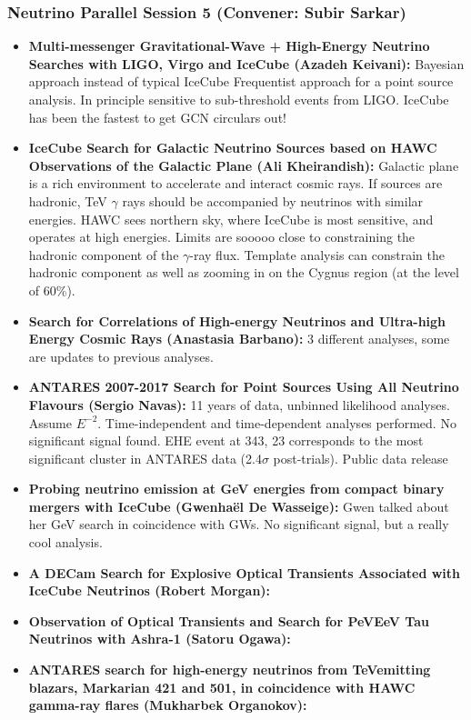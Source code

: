 \subsubsection{Neutrino Parallel Session 5 (Convener: Subir Sarkar)}
\begin{itemize}
    \item \textbf{ Multi-messenger Gravitational-Wave + High-Energy Neutrino Searches with LIGO, Virgo and IceCube (Azadeh Keivani):} Bayesian approach instead of typical IceCube Frequentist approach for a point source analysis. In principle sensitive to sub-threshold events from LIGO. IceCube has been the fastest to get GCN circulars out!
    \item \textbf{ IceCube Search for Galactic Neutrino Sources based on HAWC Observations of the Galactic Plane (Ali Kheirandish):} Galactic plane is a rich environment to accelerate and interact cosmic rays. If sources are hadronic, TeV $\gamma$ rays should be accompanied by neutrinos with similar energies. HAWC sees northern sky, where IceCube is most sensitive, and operates at high energies. Limits are sooooo close to constraining the hadronic component of the $\gamma$-ray flux. Template analysis can constrain the hadronic component as well as zooming in on the Cygnus region (at the level of 60\%).
    \item \textbf{Search for Correlations of High-energy Neutrinos and Ultra-high Energy Cosmic Rays (Anastasia Barbano):} 3 different analyses, some are updates to previous analyses.
    \item \textbf{ ANTARES 2007-2017 Search for Point Sources Using All Neutrino Flavours (Sergio Navas):} 11 years of data, unbinned likelihood analyses. Assume $E^{-2}$. Time-independent and time-dependent analyses performed. No significant signal found. EHE event at 343, 23 corresponds to the most significant cluster in ANTARES data (2.4$\sigma$ post-trials). Public data release
    \item \textbf{ Probing neutrino emission at GeV energies from compact binary mergers with IceCube (Gwenha{\"e}l De Wasseige):} Gwen talked about her GeV search in coincidence with GWs. No significant signal, but a really cool analysis. 
    \item \textbf{A DECam Search for Explosive Optical Transients Associated with IceCube Neutrinos (Robert Morgan):} 
    \item \textbf{Observation of Optical Transients and Search for PeVEeV Tau Neutrinos with Ashra-1 (Satoru Ogawa):}
    \item \textbf{ ANTARES search for high-energy neutrinos from TeVemitting blazars, Markarian 421 and 501, in coincidence with HAWC gamma-ray flares (Mukharbek Organokov):}
\end{itemize}